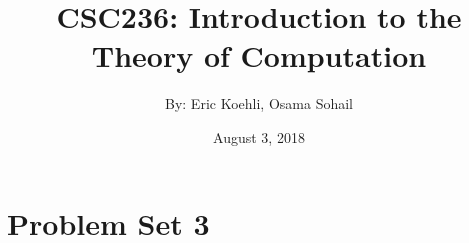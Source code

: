 \documentclass[11pt]{article}
\begin{document}
\title{CSC236: Introduction to the Theory of Computation}
\author{By: Eric Koehli, Osama Sohail}
\date{August 3, 2018}
\maketitle
\newpage

\chead{}

\section*{Problem Set 3}

 \vspace{2em}
 \vspace{2em}
 \vspace{2em}

\end{document}
